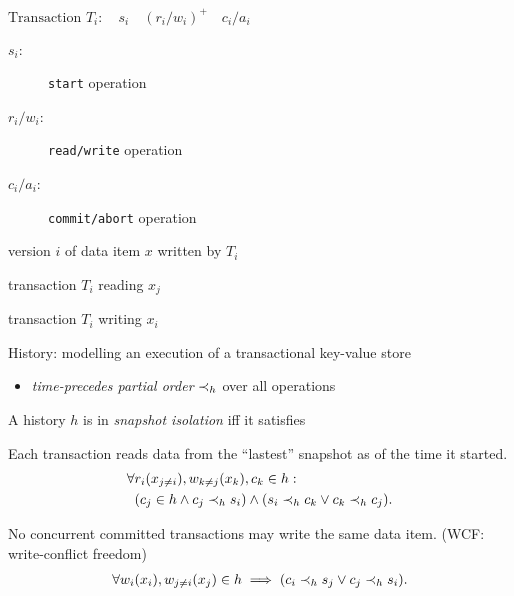 \begin{frame}{}
  $\text{Transaction } T_i:\quad s_i\quad (r_i/w_i)^{+}\quad c_i/a_i$

  \begin{description}
    \item[$s_i$:] \texttt{start} operation
    \item[$r_i/w_i$:] \texttt{read/write} operation
    \item[$c_i/a_i$:] \texttt{commit/abort} operation
  \end{description}

  \pause
  \vspace{0.20cm}
  \begin{description}[$w_i(x_i)$:]
    \item[$x_i$:] version $i$ of data item $x$ written by $T_i$
    \item[$r_i(x_j)$:] transaction $T_i$ reading $x_j$
    \item[$w_i(x_i)$:] transaction $T_i$ writing $x_i$
  \end{description}

  \pause
  \vspace{0.20cm}
  History: modelling an execution of a transactional key-value store
  \begin{itemize}
    \item \emph{time-precedes partial order} $\prec_{h}$ over all operations
  \end{itemize}
\end{frame}

\begin{frame}{}
  A history $h$ is in \emph{\large snapshot isolation} iff it satisfies  \\[0.20cm]
  \begin{description}
    \item[Snapshot Read:] %
      Each transaction reads data from the ``lastest'' snapshot as of the time it started.
      \begin{align*}
	\forall &r_i(x_{j \neq i}), w_{k \neq j}(x_k), c_k \in h: \\
	& (c_j \in h \land c_j \prec_{h} s_i)
	 \land (s_i \prec_{h} c_k \lor c_k \prec_{h} c_j).
      \end{align*}
    \pause
    \item[Snapshot Write:] No concurrent committed transactions may write the same data item. (WCF: write-conflict freedom)
      \begin{align*}
	\forall w_i(x_i), w_{j \neq i}(x_j) \in h \implies (c_i \prec_{h} s_j \lor c_j \prec_{h} s_i).
      \end{align*}
  \end{description}
\end{frame}
